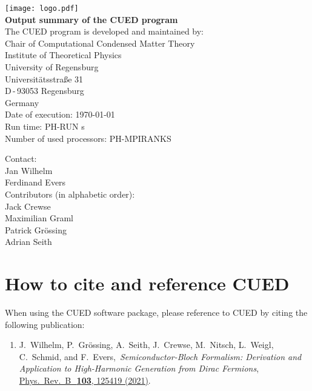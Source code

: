 \documentclass[11pt, a4paper]{scrartcl}
\newcommand{\paper}[4]{\item #1, \,\textit{#2}, \,\href{#3}{#4}.\\[-1.4em]}
\begin{document}

\begin{titlepage}
  \sffamily
  \begin{center}
{
\texttt{[image: logo.pdf]}
\\[5em]
\Huge \bfseries Output summary of the CUED program}
\\[3em]\large
The CUED program is developed and maintained by:
\\[3em]
Chair of Computational Condensed Matter Theory
  \\[0.5em]
Institute of Theoretical Physics
  \\[0.5em]
University of Regensburg
  \\[0.5em]
Universitätsstraße 31
  \\[0.5em]
D\,-\,93053 Regensburg
  \\[0.5em]
Germany
\\[3em]
Date of execution: \today
  \\[0.5em]
Run time: PH-RUN s
  \\[0.5em]
Number of used processors: PH-MPIRANKS
\\[3em]
  \end{center}{\large
  Contact:
  \\[1em]
    Jan Wilhelm
      \\[0.5em]
    Ferdinand Evers
  \\[3em]
  Contributors (in alphabetic order): 
  \\[1em]
  Jack Crewse
  \\[0.5em]
  Maximilian Graml
  \\[0.5em]
  Patrick Grössing
  \\[0.5em]
  Adrian Seith
  }
\end{titlepage}







\pagestyle{plain}




\tableofcontents


\pagestyle{fancy}
\section{How to cite and reference CUED}
When using the CUED software package, please reference to CUED by citing the following publication:
\begin{enumerate}[leftmargin=*]

\paper{J.~Wilhelm, P.~Grössing, A.~Seith, J.~Crewse, M.~Nitsch, L.~Weigl, C.~Schmid, and F.~Evers}{Semi\-con\-duc\-tor-Bloch Formalism: Derivation and Application to High-Harmonic Generation from Dirac Fermions}{https://doi.org/10.1103/PhysRevB.103.125419}{ 
Phys.~Rev.~B~\,\textbf{103}, 125419 (2021)}
\label{Wilhelm2021}

\end{enumerate}
\end{document}
